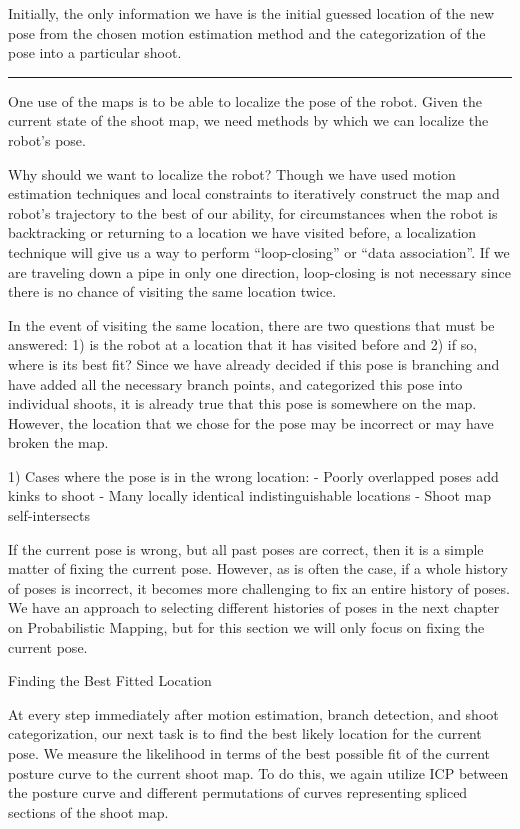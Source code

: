 Initially, the only information we have is the initial guessed location of the new pose from the chosen motion estimation method and the categorization of the pose into a particular shoot. 

\begin{center}\rule{3in}{0.4pt}\end{center}


One use of the maps is to be able to localize the pose of the robot. Given the current state of the shoot map, we need methods by which we can localize the robot’s pose.

Why should we want to localize the robot? Though we have used motion estimation techniques and local constraints to iteratively construct the map and robot’s trajectory to the best of our ability, for circumstances when the robot is backtracking or returning to a location we have visited before, a localization technique will give us a way to perform “loop-closing” or “data association”. If we are traveling down a pipe in only one direction, loop-closing is not necessary since there is no chance of visiting the same location twice. 

In the event of visiting the same location, there are two questions that must be answered: 1) is the robot at a location that it has visited before and 2) if so, where is its best fit? Since we have already decided if this pose is branching and have added all the necessary branch points, and categorized this pose into individual shoots, it is already true that this pose is somewhere on the map. However, the location that we chose for the pose may be incorrect or may have broken the map.

1) Cases where the pose is in the wrong location:
 - Poorly overlapped poses add kinks to shoot
 - Many locally identical indistinguishable locations
 - Shoot map self-intersects

If the current pose is wrong, but all past poses are correct, then it is a simple matter of fixing the current pose. However, as is often the case, if a whole history of poses is incorrect, it becomes more challenging to fix an entire history of poses. We have an approach to selecting different histories of poses in the next chapter on Probabilistic Mapping, but for this section we will only focus on fixing the current pose.

Finding the Best Fitted Location

At every step immediately after motion estimation, branch detection, and shoot categorization, our next task is to find the best likely location for the current pose. We measure the likelihood in terms of the best possible fit of the current posture curve to the current shoot map. To do this, we again utilize ICP between the posture curve and different permutations of curves representing spliced sections of the shoot map.

